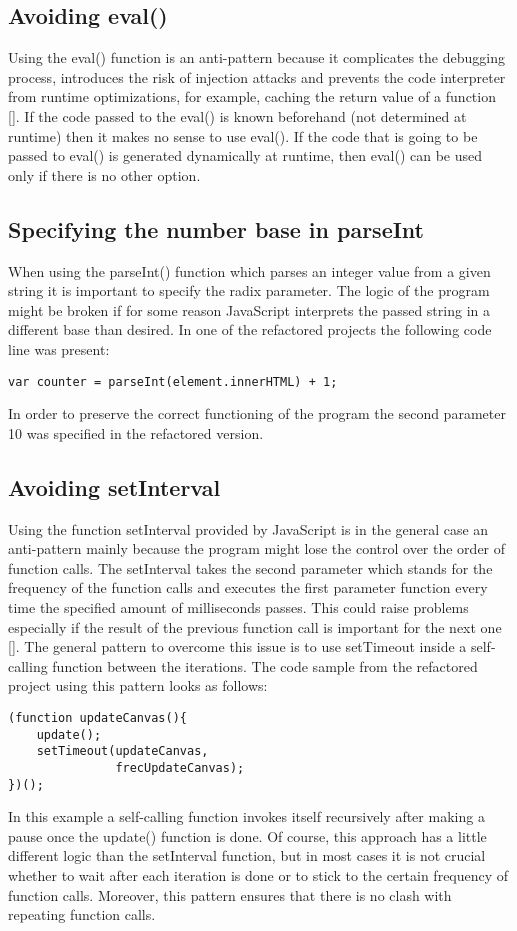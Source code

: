 \documentclass{bioinfo}
\begin{document}
\begin{methods}
\subsection{Avoiding eval()}
Using the eval() function is an anti-pattern because it complicates the debugging process, introduces the risk of injection attacks and prevents the code interpreter from runtime optimizations, for example, caching the return value of a function [\citealp{crockford}]. If the code passed to the eval() is known beforehand (not determined at runtime) then it makes no sense to use eval(). If the code that is going to be passed to eval() is generated dynamically at runtime, then eval() can be used only if there is no other option.

\subsection{Specifying the number base in parseInt}

When using the parseInt() function which parses an integer value from a given string it is important to specify the radix parameter. The logic of the program might be broken if for some reason JavaScript interprets the passed string in a different base than desired. In one of the refactored projects the following code line was present:
\begin{lstlisting}
var counter = parseInt(element.innerHTML) + 1;
\end{lstlisting}
In order to preserve the correct functioning of the program the second parameter 10 was specified in the refactored version.
\end{methods}

\subsection{Avoiding setInterval}

Using the function setInterval provided by JavaScript is in the general case an anti-pattern mainly because the program might lose the control over the order of function calls. The setInterval takes the second parameter which stands for the frequency of the function calls and executes the first parameter function every time the specified amount of milliseconds passes. This could raise problems especially if the result of the previous function call is important for the next one [\citealp{irish01}]. The general pattern to overcome this issue is to use setTimeout inside a self-calling function between the iterations. The code sample from the refactored project using this pattern looks as follows:
\begin{lstlisting}
(function updateCanvas(){
    update();
    setTimeout(updateCanvas, 
               frecUpdateCanvas);
})();
\end{lstlisting}
In this example a self-calling function invokes itself recursively after making a pause once the update() function is done. Of course, this approach has a little different logic than the setInterval function, but in most cases it is not crucial whether to wait after each iteration is done or to stick to the certain frequency of function calls. Moreover, this pattern ensures that there is no clash with repeating function calls.
\end{document}
